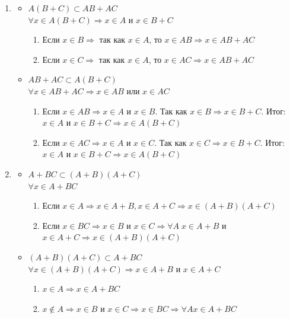 \begin{tcolorbox}[title=Доказательства]
	\begin{enumerate}
	\item \begin{itemize}
    \item $A(B+C) \subset AB + AC$\\
    $\forall x \in A(B+C) \Rightarrow x \in A \text{ и } x \in B + C$
    \begin{enumerate}
        \item Если $x \in B \Rightarrow$ так как $x \in A$, то $x \in AB \Rightarrow x \in AB + AC$
        \item Если $x \in C \Rightarrow$ так как $x \in A$, то $x \in AC \Rightarrow x \in AB + AC$
    \end{enumerate}
    
    \item $AB + AC \subset A(B+C)$\\
    $\forall x \in AB + AC \Rightarrow x \in AB \text{ или } x \in AC$
    \begin{enumerate}
        \item Если $x \in AB \Rightarrow x \in A \text{ и } x \in B$. Так как $x \in B \Rightarrow x \in B + C$. Итог: $x \in A$ и $x \in B+C \Rightarrow x \in A(B+C)$
        \item Если $x \in AC \Rightarrow x \in A \text{ и } x \in C$. Так как $x \in C \Rightarrow x \in B + C$. Итог: $x \in A$ и $x \in B+C \Rightarrow x \in A(B+C)$
    \end{enumerate}
\end{itemize}
	\item \begin{itemize}
		\item $A + BC \subset (A + B)(A + C)$\\
			$\forall x \in A + BC$
			\begin{enumerate}
				\item Если $x \in A \Rightarrow x \in A + B, x \in A + C \Rightarrow x \in (A + B)(A + C)$
				\item Если $x \in BC \Rightarrow x \in B$ и $x \in C \Rightarrow \forall A\; x \in A + B$ и $x \in A + C \Rightarrow x \in (A + B)(A + C)$
			\end{enumerate}
				\item $(A + B)(A + C) \subset A + BC $\\
					$\forall x \in (A + B)(A + C) \Rightarrow x \in A + B$ и $x \in A + C $
	\begin{enumerate}
		\item $x \in A \Rightarrow x \in A + BC$
		\item $x \not\in A \Rightarrow x \in B$ и $x \in C \Rightarrow x \in BC \Rightarrow \forall A x \in A + BC$
	\end{enumerate}
	\end{itemize}
	\end{enumerate}
\end{tcolorbox}

